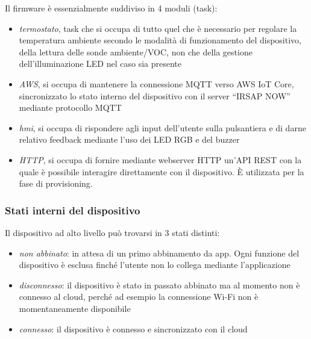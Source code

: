 \documentclass[a4paper,titlepage]{article}
\begin{document}
Il firmware è essenzialmente suddiviso in 4 moduli (task):

\begin{itemize}
    \item \textit{termostato}, task che si occupa di tutto quel che è necessario
        per regolare la temperatura ambiente secondo le modalità di funzionamento del dispositivo,
        della lettura delle sonde ambiente/VOC, non che della gestione dell'illuminazione LED
        nel caso sia presente
    \item \textit{AWS}, si occupa di mantenere la connessione MQTT verso AWS IoT Core,
        sincronizzato lo stato interno del dispositivo con il server ``IRSAP NOW'' mediante protocollo MQTT
    \item \textit{hmi}, si occupa di rispondere agli input dell'utente
        sulla pulsantiera e di darne relativo feedback mediante l'uso dei LED RGB e del buzzer
    \item \textit{HTTP}, si occupa di fornire mediante webserver HTTP un'API REST con
        la quale è possibile interagire direttamente con il dispositivo. È utilizzata
        per la fase di provisioning.
\end{itemize}

\subsubsection{Stati interni del dispositivo}

Il dispositivo ad alto livello può trovarsi in 3 stati distinti:

\begin{itemize}
    \item \textit{non abbinato}: in attesa di un primo abbinamento da app. Ogni funzione del
        dispositivo è esclusa finché l'utente non lo collega mediante l'applicazione
    \item \textit{disconnesso}: il dispositivo è stato in passato abbinato ma al momento non è
        connesso al cloud, perché ad esempio la connessione Wi-Fi non è momentaneamente disponibile
    \item \textit{connesso}: il dispositivo è connesso e sincronizzato con il cloud
\end{itemize}
\end{document}
